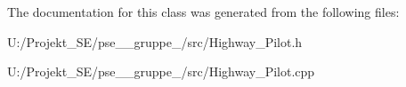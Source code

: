 The documentation for this class was generated from the following files\+:\begin{DoxyCompactItemize}
\item 
U\+:/\+Projekt\+\_\+\+S\+E/pse\+\_\+\_\+gruppe\+\_/src/Highway\+\_\+\+Pilot.\+h\item 
U\+:/\+Projekt\+\_\+\+S\+E/pse\+\_\+\_\+gruppe\+\_/src/Highway\+\_\+\+Pilot.\+cpp\end{DoxyCompactItemize}
